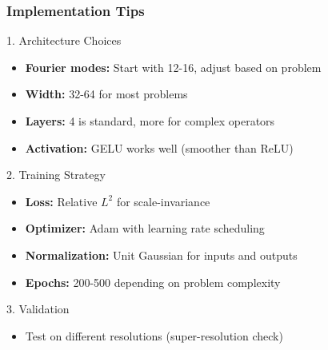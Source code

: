 \documentclass{beamer}
\begin{document}
\begin{frame}
\frametitle{Implementation Tips}

\begin{block}{1. Architecture Choices}
\begin{itemize}
    \item \textbf{Fourier modes:} Start with 12-16, adjust based on problem
    \item \textbf{Width:} 32-64 for most problems
    \item \textbf{Layers:} 4 is standard, more for complex operators
    \item \textbf{Activation:} GELU works well (smoother than ReLU)
\end{itemize}
\end{block}

\begin{block}{2. Training Strategy}
\begin{itemize}
    \item \textbf{Loss:} Relative $L^2$ for scale-invariance
    \item \textbf{Optimizer:} Adam with learning rate scheduling
    \item \textbf{Normalization:} Unit Gaussian for inputs and outputs
    \item \textbf{Epochs:} 200-500 depending on problem complexity
\end{itemize}
\end{block}

\begin{block}{3. Validation}
\begin{itemize}
    \item Test on different resolutions (super-resolution check)
\end{itemize}
\end{block}

\end{frame}
\end{document}
